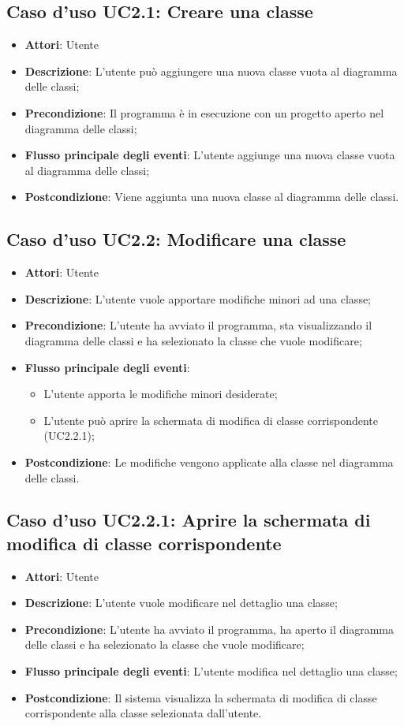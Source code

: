 \documentclass[../AnalisiDeiRequisiti.tex]{subfiles}
\begin{document}
	\subsection{Caso d'uso UC2.1: Creare una classe}
	\begin{itemize}
		\item \textbf{Attori}: Utente
		\item \textbf{Descrizione}: L'utente può aggiungere una nuova classe vuota al diagramma delle classi;
		\item \textbf{Precondizione}: Il programma è in esecuzione con un progetto aperto nel diagramma delle classi;
		\item \textbf{Flusso principale degli eventi}: L'utente aggiunge una nuova classe vuota al diagramma delle classi;
		\item \textbf{Postcondizione}: Viene aggiunta una nuova classe al diagramma delle classi.
	\end{itemize}
	\subsection{Caso d'uso UC2.2: Modificare una classe}
	\begin{itemize}
		\item \textbf{Attori}: Utente
		\item \textbf{Descrizione}: L'utente vuole apportare modifiche minori ad una classe;
		\item \textbf{Precondizione}: L'utente ha avviato il programma, sta visualizzando il diagramma delle classi e ha selezionato la classe che vuole modificare;
		\item \textbf{Flusso principale degli eventi}: \begin{itemize}
			\item L'utente apporta le modifiche minori desiderate;
			\item L'utente può aprire la schermata di modifica di classe corrispondente (UC2.2.1);
		\end{itemize}
		\item \textbf{Postcondizione}: Le modifiche vengono applicate alla classe nel diagramma delle classi.
	\end{itemize}
	\subsection{Caso d'uso UC2.2.1: Aprire la schermata di modifica di classe corrispondente}
	\begin{itemize}
		\item \textbf{Attori}: Utente
		\item \textbf{Descrizione}: L'utente vuole modificare nel dettaglio una classe;
		\item \textbf{Precondizione}: L'utente ha avviato il programma, ha aperto il diagramma delle classi e ha selezionato la classe che vuole modificare;
		\item \textbf{Flusso principale degli eventi}: L'utente modifica nel dettaglio una classe;
		\item \textbf{Postcondizione}: Il sistema visualizza la schermata di modifica di classe corrispondente alla classe selezionata dall'utente.
	\end{itemize}
\end{document}

